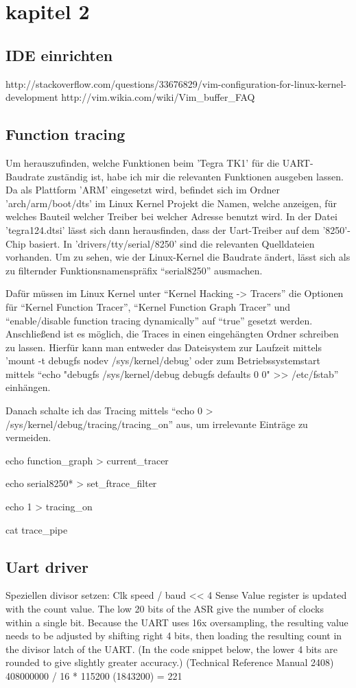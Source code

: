 \chapter{kapitel 2}
\section{IDE einrichten}
http://stackoverflow.com/questions/33676829/vim-configuration-for-linux-kernel-development
http://vim.wikia.com/wiki/Vim\_buffer\_FAQ
\section{Function tracing}
Um herauszufinden, welche Funktionen beim 'Tegra TK1' für die UART-Baudrate zuständig ist, habe ich mir die relevanten Funktionen ausgeben lassen. Da als Plattform 'ARM' eingesetzt wird, befindet sich im Ordner 'arch/arm/boot/dts' im Linux Kernel Projekt die Namen, welche anzeigen, für welches Bauteil welcher Treiber bei welcher Adresse benutzt wird. In der Datei 'tegra124.dtsi' lässt sich dann herausfinden, dass der Uart-Treiber auf dem '8250'-Chip basiert. In 'drivers/tty/serial/8250' sind die relevanten Quelldateien vorhanden. Um zu sehen, wie der Linux-Kernel die Baudrate ändert, lässt sich als zu filternder Funktionsnamenspräfix \enquote{serial8250} ausmachen. 	

Dafür müssen im Linux Kernel unter \enquote{Kernel Hacking -> Tracers} die Optionen für \enquote{Kernel Function Tracer}, \enquote{Kernel Function Graph Tracer} und \enquote{enable/disable function tracing dynamically} auf \enquote{true} gesetzt werden. Anschließend ist es möglich, die Traces in einen eingehängten Ordner schreiben zu lassen. Hierfür kann man entweder das Dateisystem zur Laufzeit mittels 'mount -t debugfs nodev /sys/kernel/debug' oder zum Betriebssystemstart mittels \enquote{echo "debugfs       /sys/kernel/debug          debugfs defaults        0       0" >> /etc/fstab} einhängen. 

Danach schalte ich das Tracing mittels \enquote{echo 0 > /sys/kernel/debug/tracing/tracing\_on} aus, um irrelevante Einträge zu vermeiden. 

echo function\_graph > current\_tracer

echo serial8250* > set\_ftrace\_filter

echo 1 > tracing\_on

cat trace\_pipe

\section{Uart driver}
Speziellen divisor setzen:
Clk speed / baud << 4
Sense Value register is updated with the count value. The low 20
bits of the ASR give the number of clocks within a single bit. Because the UART uses 16x oversampling, the resulting value
needs to be adjusted by shifting right 4 bits, then loading the resulting count in the divisor latch of the UART. (In the code
snippet below, the lower 4 bits are rounded to give slightly greater accuracy.)
(Technical Reference Manual 2408)
408000000 / 16 * 115200 (1843200) = 221

